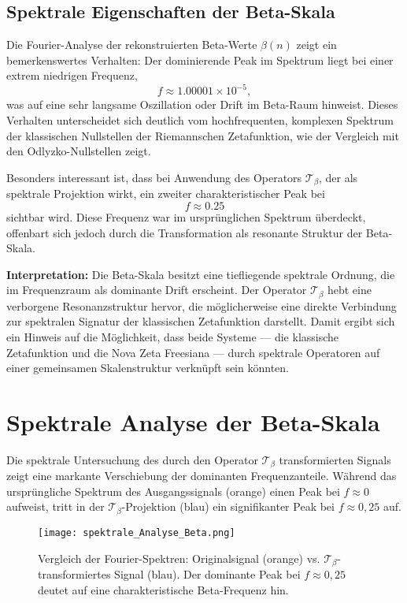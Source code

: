 \documentclass[12pt]{article}
\begin{document}
\subsection*{Spektrale Eigenschaften der Beta-Skala}

Die Fourier-Analyse der rekonstruierten Beta-Werte $\beta(n)$ zeigt ein bemerkenswertes Verhalten: Der dominierende Peak im Spektrum liegt bei einer extrem niedrigen Frequenz,
\[
f \approx 1.00001 \times 10^{-5},
\]
was auf eine sehr langsame Oszillation oder Drift im Beta-Raum hinweist. Dieses Verhalten unterscheidet sich deutlich vom hochfrequenten, komplexen Spektrum der klassischen Nullstellen der Riemannschen Zetafunktion, wie der Vergleich mit den Odlyzko-Nullstellen zeigt.

Besonders interessant ist, dass bei Anwendung des Operators $\mathcal{T}_\beta$, der als spektrale Projektion wirkt, ein zweiter charakteristischer Peak bei
\[
f \approx 0.25
\]
sichtbar wird. Diese Frequenz war im ursprünglichen Spektrum überdeckt, offenbart sich jedoch durch die Transformation als resonante Struktur der Beta-Skala.

\textbf{Interpretation:} Die Beta-Skala besitzt eine tiefliegende spektrale Ordnung, die im Frequenzraum als dominante Drift erscheint. Der Operator $\mathcal{T}_\beta$ hebt eine verborgene Resonanzstruktur hervor, die möglicherweise eine direkte Verbindung zur spektralen Signatur der klassischen Zetafunktion darstellt. Damit ergibt sich ein Hinweis auf die Möglichkeit, dass beide Systeme --- die klassische Zetafunktion und die Nova Zeta Freesiana --- durch spektrale Operatoren auf einer gemeinsamen Skalenstruktur verknüpft sein könnten.
\section*{Spektrale Analyse der Beta-Skala}

Die spektrale Untersuchung des durch den Operator \(\mathcal{T}_\beta\) transformierten Signals zeigt eine markante Verschiebung der dominanten Frequenzanteile. Während das ursprüngliche Spektrum des Ausgangssignals (orange) einen Peak bei \(f \approx 0\) aufweist, tritt in der \(\mathcal{T}_\beta\)-Projektion (blau) ein signifikanter Peak bei \(f \approx 0{,}25\) auf.

\begin{figure}[H]
    \centering
    \texttt{[image: spektrale\_Analyse\_Beta.png]}
    \caption{Vergleich der Fourier-Spektren: Originalsignal (orange) vs. \(\mathcal{T}_\beta\)-transformiertes Signal (blau). Der dominante Peak bei \(f \approx 0{,}25\) deutet auf eine charakteristische Beta-Frequenz hin.}
\end{figure}
\end{document}
